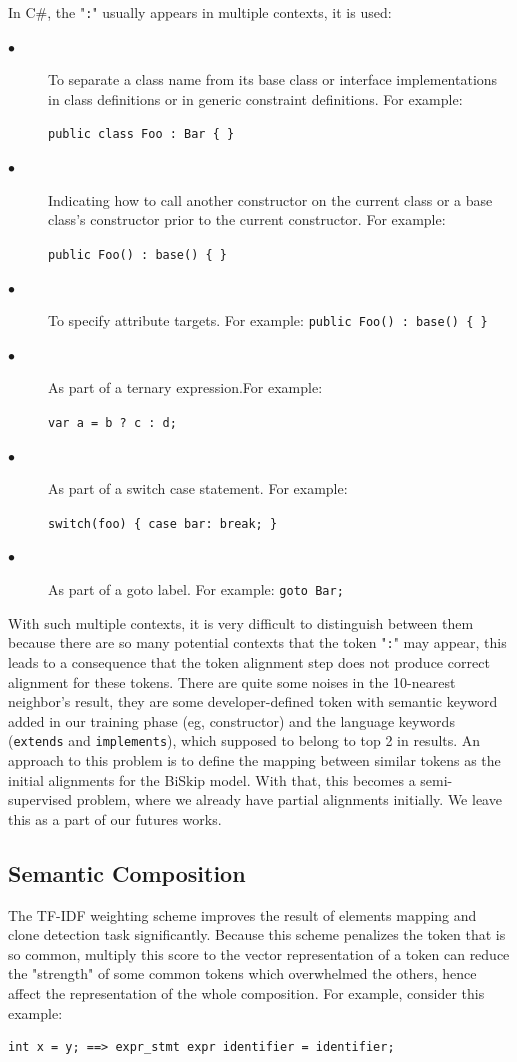 In C\#, the "\texttt{:}" usually appears in multiple contexts, it is used:

\begin{description}
	\item [$\bullet$] To separate a class name from its base class or interface implementations in class definitions or in generic constraint definitions. For example: 
	
	\texttt{public class Foo : Bar \{ \}}
	\item [$\bullet$] Indicating how to call another constructor on the current class or a base class's constructor prior to the current constructor. For example: 
	
	\texttt{public Foo() : base() \{ \}}
	\item [$\bullet$] To specify attribute targets. For example: \texttt{public Foo() : base() \{ \}}
	\item [$\bullet$] As part of a ternary expression.For example:
	
	\texttt{var a = b ? c : d;}
	\item [$\bullet$] As part of a switch case statement. For example:
	
	\texttt{switch(foo) \{ case bar: break; \}}
	\item [$\bullet$] As part of a goto label. For example:
	\texttt{goto Bar;}
	
\end{description}

With such multiple contexts, it is very difficult to distinguish between them because there are so many potential contexts that the token "\texttt{:}" may appear, this leads to a consequence that the token alignment step does not produce correct alignment for these tokens. There are quite some noises in the 10-nearest neighbor's result, they are some developer-defined token with semantic keyword added in our training phase (eg, constructor) and the language keywords (\texttt{extends} and \texttt{implements}), which supposed to belong to top 2 in results. An approach to this problem is to define the mapping between similar tokens as the initial alignments for the BiSkip model. With that, this becomes a semi-supervised problem, where we already have partial alignments initially. We leave this as a part of our futures works.

\subsection{Semantic Composition}
The TF-IDF weighting scheme improves the result of elements mapping and clone detection task significantly. Because this scheme penalizes the token that is so common, multiply this score to the vector representation of a token can reduce the "strength" of some common tokens which overwhelmed the others, hence affect the representation of the whole composition. For example, consider this example:
\begin{lstlisting}
int x = y; ==> expr_stmt expr identifier = identifier;
\end{lstlisting}

